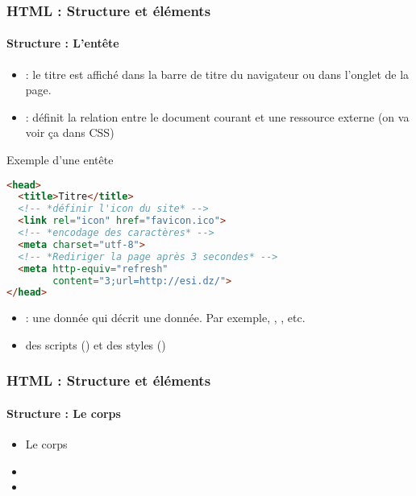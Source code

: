 \documentclass[xcolor=table]{beamer}
\begin{document}
\begin{frame}[fragile]
\frametitle{HTML : Structure et éléments}
\framesubtitle{Structure : L'entête}

\begin{minipage}{0.44\textwidth} 
\begin{itemize}
	\item {} : le titre est affiché dans la barre de titre du navigateur ou dans l'onglet de la page.
	\item {} : définit la relation entre le document courant et une ressource externe (on va voir ça dans CSS)
	
\end{itemize}
\end{minipage}
%
\begin{minipage}{0.55\textwidth}
\begin{exampleblock}{Exemple d'une entête}
\lstset{escapeinside=**}
\scriptsize\bfseries
\begin{lstlisting}[language={html}]
<head>
  <title>Titre</title>
  <!-- *définir l'icon du site* -->
  <link rel="icon" href="favicon.ico">
  <!-- *encodage des caractères* -->
  <meta charset="utf-8">
  <!-- *Rediriger la page après 3 secondes* -->
  <meta http-equiv="refresh" 
        content="3;url=http://esi.dz/">
</head>
\end{lstlisting}
\end{exampleblock}
\end{minipage}

\begin{itemize}
	\item {} : une donnée qui décrit une donnée. 
	Par exemple, , , etc.
	\item des scripts () et des styles ()
\end{itemize}

\end{frame}

\begin{frame}
\frametitle{HTML : Structure et éléments}
\framesubtitle{Structure : Le corps}

\begin{itemize}
	\item Le corps 
	\item 
	\item 
\end{itemize}

\end{frame}
\end{document}
